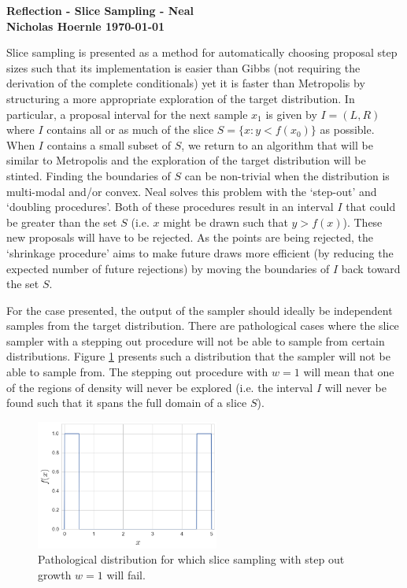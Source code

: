 \documentclass[twoside]{article}
\begin{document}
\textbf{Reflection - Slice Sampling - Neal}\\
\textbf{Nicholas Hoernle \hfill \today}

Slice sampling is presented as a method for automatically choosing proposal step sizes such that its implementation is easier than Gibbs (not requiring the derivation of the complete conditionals) yet it is faster than Metropolis by structuring a more appropriate exploration of the target distribution. In particular, a proposal interval for the next sample $x_1$ is given by $I=(L,R)$ where $I$ contains all or as much of the slice $S = \{ x : y < f(x_0) \}$ as possible. When $I$ contains a small subset of $S$, we return to an algorithm that will be similar to Metropolis and the exploration of the target distribution will be stinted. Finding the boundaries of $S$ can be non-trivial when the distribution is multi-modal and/or convex. Neal solves this problem with the `step-out' and `doubling procedures'. Both of these procedures result in an interval $I$ that could be greater than the set $S$ (i.e. $x$ might be drawn such that $y > f(x)$). These new proposals will have to be rejected. As the points are being rejected, the `shrinkage procedure' aims to make future draws more efficient (by reducing the expected number of future rejections) by moving the boundaries of $I$ back toward the set $S$.

For the case presented, the output of the sampler should ideally be independent samples from the target distribution. There are pathological cases where the slice sampler with a stepping out procedure will not be able to sample from certain distributions. Figure \ref{problem_distribution} presents such a distribution that the sampler will not be able to sample from. The stepping out procedure with $w=1$ will mean that one of the regions of density will never be explored (i.e. the interval $I$ will never be found such that it spans the full domain of a slice $S$).

\begin{figure}[h]
\centering
\includegraphics[width=6cm]{problem_distribution.png}
\caption{Pathological distribution for which slice sampling with step out growth $w=1$ will fail.}\label{problem_distribution}
\end{figure}
\end{document}
